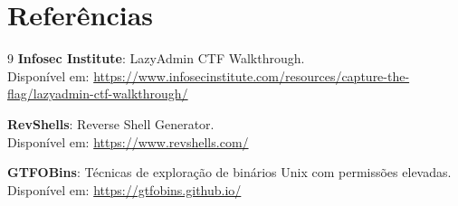 \documentclass[12pt]{article}
\begin{document}
\section{Referências}

\begin{thebibliography}{9}
    \textbf{Infosec Institute}: LazyAdmin CTF Walkthrough. \\
    Disponível em: \url{https://www.infosecinstitute.com/resources/capture-the-flag/lazyadmin-ctf-walkthrough/}
    
    \textbf{RevShells}: Reverse Shell Generator. \\
    Disponível em: \url{https://www.revshells.com/}

    \textbf{GTFOBins}: Técnicas de exploração de binários Unix com permissões elevadas. \\
    Disponível em: \url{https://gtfobins.github.io/}

\end{thebibliography}
\end{document}
